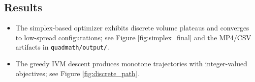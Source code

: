 \documentclass[
  10pt,
]{article}
\providecommand{\tightlist}{%
  \setlength{\itemsep}{0pt}\setlength{\parskip}{0pt}}
\begin{document}
\hypertarget{results}{%
\subsection{Results}\label{results}}

\begin{itemize}
\tightlist
\item
  The simplex-based optimizer exhibits discrete volume plateaus and
  converges to low-spread configurations; see Figure
  \ref{fig:simplex_final} and the MP4/CSV artifacts in
  \texttt{quadmath/output/}.
\item
  The greedy IVM descent produces monotone trajectories with
  integer-valued objectives; see Figure \ref{fig:discrete_path}.
\end{itemize}
\end{document}
